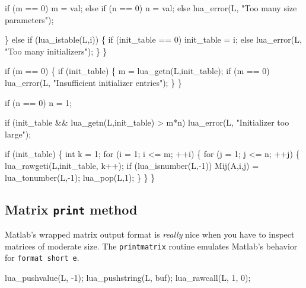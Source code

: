         if      (m == 0)  m = val;
        else if (n == 0)  n = val;
        else              lua_error(L, "Too many size parameters");

    \} else if (lua_istable(L,i)) \{
        if (init_table == 0)
            init_table = i;
        else
            lua_error(L, "Too many initializers");
    \}
\}

\nwendcode{}\nwdocspar

\nwenddocs{}\plusendmoddef
if (m == 0) \{
    if (init_table) \{
        m = lua_getn(L,init_table);
        if (m == 0)
            lua_error(L, "Insufficient initializer entries");
    \}
\}

if (n == 0)
    n = 1;

if (init_table && lua_getn(L,init_table) > m*n)
    lua_error(L, "Initializer too large");

\nwendcode{}\nwdocspar

\nwenddocs{}\endmoddef
if (init_table) \{
    int k = 1;
    for (i = 1; i <= m; ++i) \{
        for (j = 1; j <= n; ++j) \{
            lua_rawgeti(L,init_table, k++);
            if (lua_isnumber(L,-1))
                Mij(A,i,j) = lua_tonumber(L,-1);
            lua_pop(L,1);
        \}
    \}
\}
\nwendcode{}\nwdocspar

\subsection{Matrix {\tt{}print} method}

Matlab's wrapped matrix output format is \emph{really} nice when you
have to inspect matrices of moderate size.  The {\tt{}print{}matrix} routine
emulates Matlab's behavior for {\tt{}format\ short\ e}.

\nwenddocs{}\endmoddef
lua_pushvalue(L, -1);
lua_pushstring(L, buf);
lua_rawcall(L, 1, 0);
\nwendcode{}\nwdocspar

